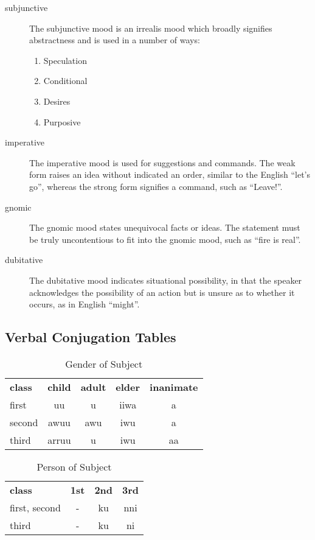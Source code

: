 \begin{description}

\item[subjunctive] The subjunctive mood is an irrealis mood which broadly
  signifies abstractness and is used in a number of ways:

  \begin{enumerate}
      \item Speculation
      \item Conditional
      \item Desires
      \item Purposive
  \end{enumerate}

\item[imperative] The imperative mood is used for suggestions and commands. The
  weak form raises an idea without indicated an order, similar to the English
  ``let's go'', whereas the strong form signifies a command, such as ``Leave!''.

\item[gnomic] The gnomic mood states unequivocal facts or ideas. The statement
  must be truly uncontentious to fit into the gnomic mood, such as ``fire is
  real''.

\item[dubitative] The dubitative mood indicates situational possibility, in that
  the speaker acknowledges the possibility of an action but is unsure as to
  whether it occurs, as in English ``might''.

\end{description}

\subsection{Verbal Conjugation Tables}

\begin{table}[h]
\centering
\begin{tabular}{lcccc}
\textbf{class} & \textbf{child} & \textbf{adult} & \textbf{elder} & \textbf{inanimate}\\
first & uu & u & iiwa & a\\
second & awuu & awu & iwu & a\\
third & arruu & u & iwu & aa\\
\end{tabular}
\caption{Gender of Subject}
\end{table}

\begin{table}[h]
\centering
\begin{tabular}{lccc}
\textbf{class} & \textbf{1st} & \textbf{2nd} & \textbf{3rd} \\
first, second & -           & ku          & nni    \\
third & -           & ku          & ni    \\
\end{tabular}
\caption{Person of Subject}
\end{table}

